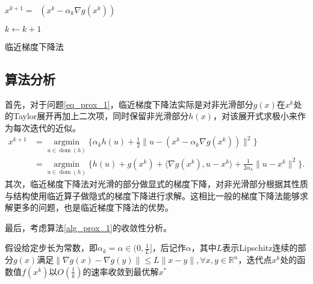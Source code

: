 \begin{algorithm}\label{alg_prox_1}

    \SetAlgoLined

     {
        $x^{k+1} = \mathop{\mathrm{prox_{\alpha_{k} h}}}(x^{k} - \alpha_{k}\nabla g(x^{k}))$

        $k \leftarrow k+1$
    }
    \caption{临近梯度下降法}
\end{algorithm}

\subsection{算法分析}

首先，对于问题\ref{eq_prox_1}，临近梯度下降法实际是对非光滑部分$g(x)$在$x^{k}$处的Taylor展开再加上二次项，同时保留非光滑部分$h(x)$，对该展开式求极小来作为每次迭代的近似。
\begin{equation}
    \begin{split}
        x^{k+1} &=  \mathop{\mathrm{argmin}}\limits_{u\in \mathop{\mathrm{dom}} (h)}\{\alpha_{k}h(u) + \frac{1}{2}\|u-(x^{k}-\alpha_{k}\nabla g(x^{k}))\|^{2}\} \\
                &= \mathop{\mathrm{argmin}}\limits_{u\in \mathop{\mathrm{dom}} (h)} \{h(u)+g(x^{k})+\langle \nabla g(x^{k}), u-x^{k} \rangle + \frac{1}{2\alpha_{k}}\|u-x^{k}\|^{2}\}.
    \end{split}
\end{equation}
其次，临近梯度下降法对光滑的部分做显式的梯度下降，对非光滑部分根据其性质与结构使用临近算子做隐式的梯度下降进行求解。这相比一般的梯度下降法能够求解更多的问题，也是临近梯度下降法的优势。

最后，考虑算法\ref{alg_prox_1}的收敛性分析。

\begin{theorem}
    假设给定步长为常数，即$\alpha_{k}=\alpha\in (0, \frac{1}{L}]$，后记作$\alpha$，其中$L$表示Lipschitz连续的部分$g(x)$满足$\|\nabla g(x)-\nabla g(y)\| \leq L\|x-y\|, \forall x, y \in \mathbb{R}^{n}$，迭代点$x^{k}$处的函数值$f(x^{k})$以$O(\frac{1}{k})$的速率收敛到最优解$x^{*}$
\end{theorem}

